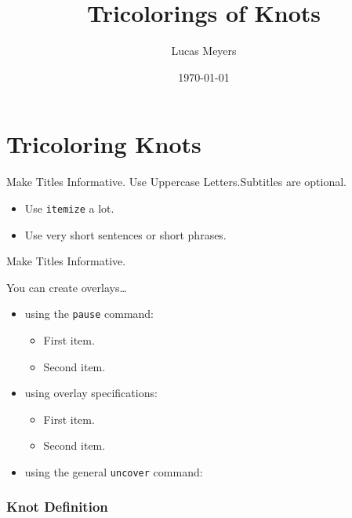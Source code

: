 \documentclass{beamer}
\title{Tricolorings of Knots}
\author{Lucas Meyers}
\institute[Louisiana State University] %
{Department of Mathematics\\
Louisiana State University}
\date[Short Occasion] %
{\today}
\begin{document}
\begin{frame}
  \titlepage
\end{frame}

\section{Tricoloring Knots}

\begin{frame}{Make Titles Informative. Use Uppercase Letters.}{Subtitles are optional.}

  \begin{itemize}
  \item
    Use \texttt{itemize} a lot.
  \item
    Use very short sentences or short phrases.
  \end{itemize}
\end{frame}

\begin{frame}{Make Titles Informative.}

  You can create overlays\dots
  \begin{itemize}
  \item using the \texttt{pause} command:
    \begin{itemize}
    \item
      First item.
      \pause
    \item    
      Second item.
    \end{itemize}
  \item
    using overlay specifications:
    \begin{itemize}
    \item<3->
      First item.
    \item<4->
      Second item.
    \end{itemize}
  \item
    using the general \texttt{uncover} command:
    \begin{itemize}
    \end{itemize}
  \end{itemize}
\end{frame}

\begin{frame}
  \frametitle{Knot Definition}
  
\end{frame}
\end{document}
